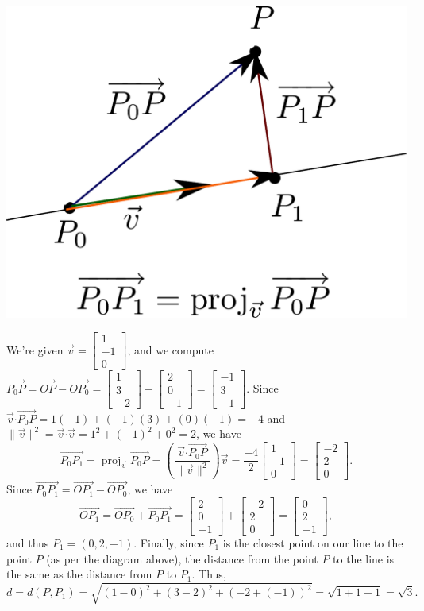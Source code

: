 \documentclass[12pt]{article}
\newcommand{\len}[1]{\lVert #1\rVert}
\newcommand{\dotp}{\boldsymbol{\cdot}}
\newcommand{\bbm}{\begin{bmatrix}}
\newcommand{\ebm}{\end{bmatrix}}
\DeclareMathOperator{\proj}{proj}
\begin{document}
\begin{enumerate}
\begin{multicols}{2}
\begin{center}
 \includegraphics[width=0.7\columnwidth]{WS3-3}
\end{center}
\end{multicols}
We're given $\vec{v} = \bbm 1\\-1\\0\ebm$, and we compute $\overrightarrow{P_0P}=\overrightarrow{OP}-\overrightarrow{OP_0} = \bbm 1\\3\\-2\ebm-\bbm 2\\0\\-1\ebm =\bbm -1\\3\\-1\ebm$. Since $\vec{v}\dotp \overrightarrow{P_0P} = 1(-1)+(-1)(3)+(0)(-1) = -4$ and $\len{\vec{v}}^2 = \vec{v}\dotp\vec{v} = 1^2+(-1)^2+0^2 = 2$, we have
\[
 \overrightarrow{P_0P_1} = \proj_{\vec{v}}\overrightarrow{P_0P} = \left(\frac{\vec{v}\dotp \overrightarrow{P_0P}}{\len{\vec{v}}^2}\right)\vec{v} = \frac{-4}{2}\bbm 1\\-1\\0\ebm = \bbm -2\\2\\0\ebm.
\]
Since $\overrightarrow{P_0P_1} = \overrightarrow{OP_1}-\overrightarrow{OP_0}$, we have
\[
 \overrightarrow{OP_1} = \overrightarrow{OP_0}+\overrightarrow{P_0P_1} = \bbm 2\\0\\-1\ebm + \bbm -2\\2\\0\ebm = \bbm 0\\2\\-1\ebm,
\]
and thus $P_1 = (0,2,-1)$. Finally, since $P_1$ is the closest point on our line to the point $P$ (as per the diagram above), the distance from the point $P$ to the line is the same as the distance from $P$ to $P_1$. Thus,
\[
 d = d(P,P_1) = \sqrt{(1-0)^2+(3-2)^2+(-2+(-1))^2} = \sqrt{1+1+1}=\sqrt{3}.
\]


\end{enumerate}
\end{document}
